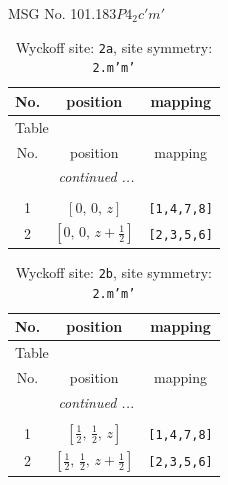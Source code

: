 \documentclass[fleqn,8pt]{jsarticle}
\begin{document}
\setcounter{MaxMatrixCols}{32}

\renewcommand{\tablename}{Table~}
\renewcommand{\figurename}{Figure~}
\begin{center}
\LARGE
MSG No. 101.183\quad$P4_{2}c'm'$
\end{center}
\renewcommand{\arraystretch}{1.2}
\begin{longtable}{ccc}
\caption{Wyckoff site: {\tt 2a}, site symmetry: {\tt 2.m'm'}}
 \\
 \hline \hline
No. & position & mapping \\ \hline \endfirsthead

\multicolumn{2}{l}{\tablename\ \thetable{}} \\
 \hline \hline
No. & position & mapping \\ \hline \endhead

 \hline \hline
\multicolumn{2}{r}{\footnotesize\it continued ...} \\ \endfoot

 \hline \hline
\multicolumn{2}{r}{} \\ \endlastfoot

1 & $\left[ 0,\, 0,\, z \right]$ & {\tt [1,4,7,8]} \\ \hline
2 & $\left[ 0,\, 0,\, z + \frac{1}{2} \right]$ & {\tt [2,3,5,6]} \\
\end{longtable}
\renewcommand{\arraystretch}{1.2}
\begin{longtable}{ccc}
\caption{Wyckoff site: {\tt 2b}, site symmetry: {\tt 2.m'm'}}
 \\
 \hline \hline
No. & position & mapping \\ \hline \endfirsthead

\multicolumn{2}{l}{\tablename\ \thetable{}} \\
 \hline \hline
No. & position & mapping \\ \hline \endhead

 \hline \hline
\multicolumn{2}{r}{\footnotesize\it continued ...} \\ \endfoot

 \hline \hline
\multicolumn{2}{r}{} \\ \endlastfoot

1 & $\left[ \frac{1}{2},\, \frac{1}{2},\, z \right]$ & {\tt [1,4,7,8]} \\ \hline
2 & $\left[ \frac{1}{2},\, \frac{1}{2},\, z + \frac{1}{2} \right]$ & {\tt [2,3,5,6]} \\
\end{longtable}
\end{document}

